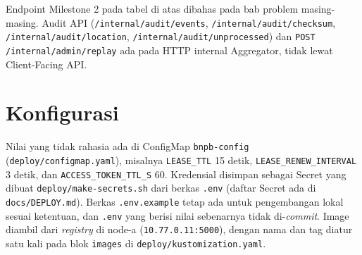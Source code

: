 Endpoint Milestone 2 pada tabel di atas dibahas pada bab problem masing-masing. Audit API (\texttt{/internal/audit/events}, \texttt{/internal/audit/checksum}, \texttt{/internal/audit/location}, \texttt{/internal/audit/unprocessed}) dan \texttt{POST /internal/admin/replay} ada pada HTTP internal Aggregator, tidak lewat Client-Facing API.

\section{Konfigurasi}

Nilai yang tidak rahasia ada di ConfigMap \texttt{bnpb-config} (\texttt{deploy/configmap.yaml}), misalnya \texttt{LEASE\_TTL} 15 detik, \texttt{LEASE\_RENEW\_INTERVAL} 3 detik, dan \texttt{ACCESS\_TOKEN\_TTL\_S} 60. Kredensial disimpan sebagai Secret yang dibuat \texttt{deploy/make-secrets.sh} dari berkas \texttt{.env} (daftar Secret ada di \texttt{docs/DEPLOY.md}). Berkas \texttt{.env.example} tetap ada untuk pengembangan lokal sesuai ketentuan, dan \texttt{.env} yang berisi nilai sebenarnya tidak di-\textit{commit}. Image diambil dari \textit{registry} di node-a (\texttt{10.77.0.11:5000}), dengan nama dan tag diatur satu kali pada blok \texttt{images} di \texttt{deploy/kustomization.yaml}.

